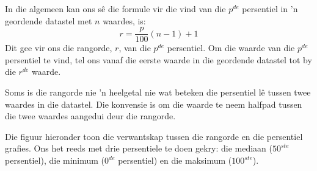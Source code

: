 In die algemeen kan ons sê die formule vir die vind van die $p^{de}$ persentiel in ’n geordende datastel met $n$ waardes, is: 
\begin{equation*}
  r = \frac{p}{100}\left(n-1\right)+1
\end{equation*}
Dit gee vir ons die rangorde, $r$, van die $p^{de}$ persentiel. Om die waarde van die $p^{de}$ persentiel te vind, tel ons vanaf die eerste waarde in die geordende datastel tot by die $r^{de}$ waarde.

Soms is die rangorde nie ’n heelgetal nie wat beteken die persentiel lê tussen twee waardes in die datastel. Die konvensie is om die waarde te neem halfpad tussen die twee waardes aangedui deur die rangorde.

 Die figuur hieronder toon die verwantskap tussen die rangorde en die persentiel grafies. Ons het reeds met drie persentiele te doen gekry: die mediaan ($50^{ste}$ persentiel), die minimum ($0^{de}$ persentiel) en die maksimum ($100^{ste}$).
\begin{center}
\end{center}



